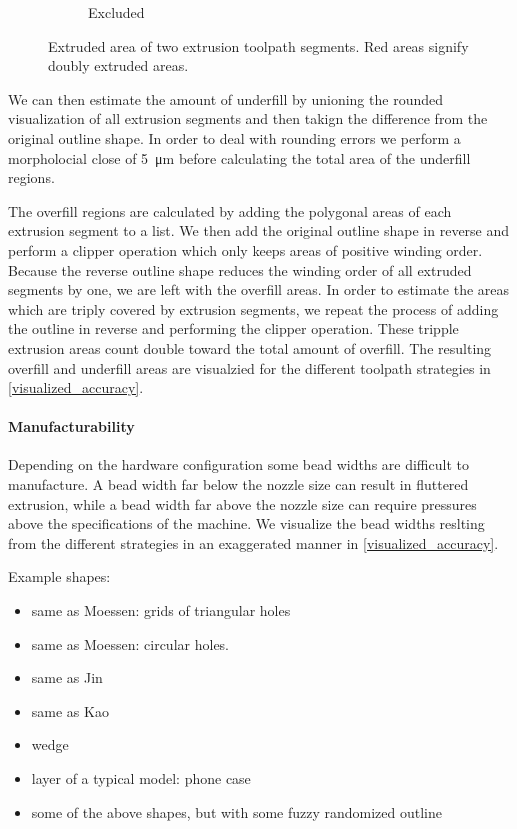 \begin{figure}
\begin{subfigure}{\figwidth}
\caption{Excluded}
\end{subfigure}
\caption{
Extruded area of two extrusion toolpath segments.
Red areas signify doubly extruded areas.
}
\label{segment_visualization}
\end{figure}

We can then estimate the amount of underfill by unioning the rounded visualization of all extrusion segments and then takign the difference from the original outline shape.
In order to deal with rounding errors we perform a morpholocial close of \SI{5}{\micro\meter} before calculating the total area of the underfill regions.

The overfill regions are calculated by adding the polygonal areas of each extrusion segment to a list.
We then add the original outline shape in reverse and perform a clipper operation which only keeps areas of positive winding order.
Because the reverse outline shape reduces the winding order of all extruded segments by one, we are left with the overfill areas.
In order to estimate the areas which are triply covered by extrusion segments, we repeat the process of adding the outline in reverse and performing the clipper operation.
These tripple extrusion areas count double toward the total amount of overfill.
The resulting overfill and underfill areas are visualzied for the different toolpath strategies in \cref{visualized_accuracy}.





\paragraph{Manufacturability}
Depending on the hardware configuration some bead widths are difficult to manufacture.
A bead width far below the nozzle size can result in fluttered extrusion, while a bead width far above the nozzle size can require pressures above the specifications of the machine.
We visualize the bead widths reslting from the different strategies in an exaggerated manner in \cref{visualized_accuracy}.

Example shapes:
\begin{itemize}
\item same as Moessen: grids of triangular holes
\item same as Moessen: circular holes.
\item same as Jin 
\item same as Kao
\item wedge
\item layer of a typical model: phone case
\item some of the above shapes, but with some fuzzy randomized outline
\end{itemize}





